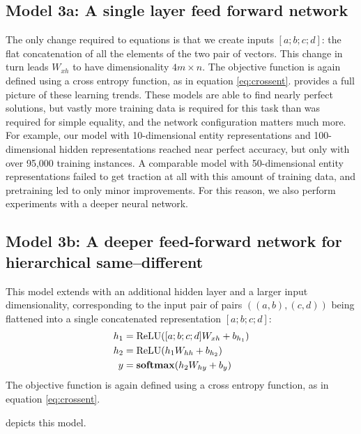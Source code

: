 \subsection{Model 3a: A single layer feed forward network }
 The only change required to equations  is that we create inputs $[a;b;c;d]$: the flat concatenation of all the elements of the two pair of vectors. This change in turn leads $W_{xh}$ to have dimensionality $4m \times n$. The objective function is again defined using a cross entropy function, as in equation \ref{eq:crossent}.  provides a full picture of these learning trends. These models are able to find nearly perfect solutions, but vastly more training data is required for this task than was required for simple equality, and the network configuration matters much more. For example, our model with 10-dimensional entity representations and 100-dimensional hidden representations reached near perfect accuracy, but only with over 95,000 training instances. A comparable model with 50-dimensional entity representations failed to get traction at all with this amount of training data, and pretraining led to only minor improvements. For this reason, we also perform experiments with a deeper neural network.


\subsection{Model 3b: A deeper feed-forward network for hierarchical same--different}\label{sec:model3a}

This model extends  with an additional hidden layer and a larger input dimensionality, corresponding to the input pair of pairs $((a,b), (c,d))$ being flattened into a single concatenated representation $[a;b;c;d]$:
%
\begin{align}
  h_{1} &= \operatorname{ReLU}([a;b;c;d]W_{xh} + b_{h_{1}}) \label{eq:x2h1-supp}\\
  h_{2} &= \operatorname{ReLU}(h_{1}W_{hh} + b_{h_{2}}) \label{eq:x2h2-supp}\\
  y &= \mathbf{softmax}(h_{2}W_{hy} + b_{y}) \label{eq:h2y2-supp}
\end{align}
%
The objective function is again defined using a cross entropy function, as in equation \ref{eq:crossent}.

 depicts this model.

